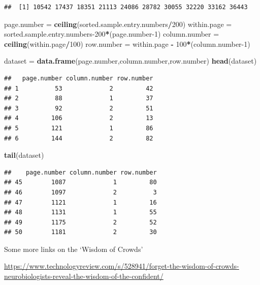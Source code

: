\documentclass[]{book}
\newenvironment{Shaded}{\begin{snugshade}}{\end{snugshade}}
\newcommand{\DecValTok}[1]{\textcolor[rgb]{0.00,0.00,0.81}{#1}}
\newcommand{\KeywordTok}[1]{\textcolor[rgb]{0.13,0.29,0.53}{\textbf{#1}}}
\newcommand{\NormalTok}[1]{#1}
\newcommand{\OperatorTok}[1]{\textcolor[rgb]{0.81,0.36,0.00}{\textbf{#1}}}
\newcommand{\StringTok}[1]{\textcolor[rgb]{0.31,0.60,0.02}{#1}}
\begin{document}
\begin{verbatim}
##  [1] 10542 17437 18351 21113 24086 28782 30055 32220 33162 36443
\end{verbatim}

\begin{Shaded}
\begin{Highlighting}[]
\NormalTok{page.number =}\StringTok{ }\KeywordTok{ceiling}\NormalTok{(sorted.sample.entry.numbers}\OperatorTok{/}\DecValTok{200}\NormalTok{)}
\NormalTok{within.page =}\StringTok{ }\NormalTok{sorted.sample.entry.numbers}\DecValTok{-200}\OperatorTok{*}\NormalTok{(page.number}\DecValTok{-1}\NormalTok{)}
\NormalTok{column.number =}\StringTok{ }\KeywordTok{ceiling}\NormalTok{(within.page}\OperatorTok{/}\DecValTok{100}\NormalTok{)}
\NormalTok{row.number =}\StringTok{ }\NormalTok{within.page }\OperatorTok{-}\StringTok{ }\DecValTok{100}\OperatorTok{*}\NormalTok{(column.number}\DecValTok{-1}\NormalTok{)}

\NormalTok{dataset =}\StringTok{ }\KeywordTok{data.frame}\NormalTok{(page.number,column.number,row.number)}
\KeywordTok{head}\NormalTok{(dataset)}
\end{Highlighting}
\end{Shaded}

\begin{verbatim}
##   page.number column.number row.number
## 1          53             2         42
## 2          88             1         37
## 3          92             2         51
## 4         106             2         13
## 5         121             1         86
## 6         144             2         82
\end{verbatim}

\begin{Shaded}
\begin{Highlighting}[]
\KeywordTok{tail}\NormalTok{(dataset)}
\end{Highlighting}
\end{Shaded}

\begin{verbatim}
##    page.number column.number row.number
## 45        1087             1         80
## 46        1097             2          3
## 47        1121             1         16
## 48        1131             1         55
## 49        1175             2         52
## 50        1181             2         30
\end{verbatim}

Some more links on the `Wisdom of Crowds'

\url{https://www.technologyreview.com/s/528941/forget-the-wisdom-of-crowds-neurobiologists-reveal-the-wisdom-of-the-confident/}
\end{document}
